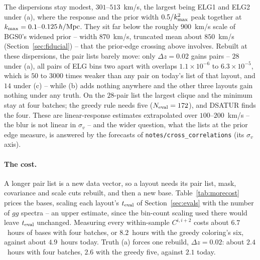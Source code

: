 \documentclass[11pt]{article}
\newcommand{\kmax}{k_{\rm max}}
\newcommand{\hMpc}{\,h/{\rm Mpc}}
\newcommand{\us}{\_\allowbreak}
\begin{document}
The dispersions stay modest, $301$--$513$~km/s, the largest being ELG1
and ELG2 under (a), where the response and the prior width
$0.5/\kmax^2$ peak together at $\kmax = 0.1$--$0.125\hMpc$.  They sit
far below the roughly $900$~km/s scale of BGS0's widened prior --
width $870$~km/s, truncated mean about $850$~km/s
(Section~\ref{sec:fiducial}) -- that the prior-edge crossing above
involves.  Rebuilt at these dispersions, the pair lists barely move:
only $\Delta z = 0.02$ gains pairs -- $28$ under (a), all pairs of ELG
bins two apart with overlaps $1.1\times10^{-6}$ to
$6.3\times10^{-5}$, which is $50$ to $3000$ times weaker than any pair
on today's list of that layout, and $14$ under (c) -- while (b) adds
nothing anywhere and the other three layouts gain nothing under any
truth.  On the $28$-pair list the largest clique and the minimum stay
at four batches; the greedy rule needs five ($N_{\rm eval} = 172$),
and DSATUR finds the four.  These are linear-response estimates
extrapolated over $100$--$200$~km/s -- the blur is not linear in
$\sigma_v$ -- and the wider question, what the lists at the prior
edge measure, is answered by the forecasts of
\texttt{notes/cross\us correlations} (its $\sigma_v$ axis).

\paragraph{The cost.}
A longer pair list is a new data vector, so a layout needs its pair
list, mask, covariance and scale cuts rebuilt, and then a new base.
Table~\ref{tab:morecost} prices the bases, scaling each layout's
$t_{\rm eval}$ of Section~\ref{sec:evals} with the number of $gg$
spectra -- an upper estimate, since the bin-count scaling used there
would leave $t_{\rm eval}$ unchanged.  Measuring every within-sample
$C^{i,i+2}$ costs about $6.7$~hours of bases with four batches, or
$8.2$~hours with the greedy coloring's six, against about $4.9$~hours
today.  Truth (a) forces one rebuild, $\Delta z = 0.02$: about
$2.4$~hours with four batches, $2.6$ with the greedy five, against
$2.1$ today.
\end{document}
